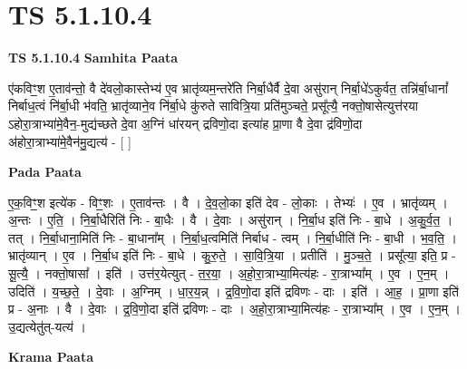 \documentclass[17pt]{extarticle}
\begin{document}
\section{ TS 5.1.10.4 }

\textbf{TS 5.1.10.4 } \newline
\textbf{Samhita Paata} \newline

ए॑कविꣳ॒॒श ए॒ताव॑न्तो॒ वै दे॑वलो॒कास्तेभ्य॑ ए॒व भ्रातृ॑व्यम॒न्तरे॑ति निर्बा॒धैर्वै दे॒वा असु॑रान् निर्बा॒धे॑ऽकुर्वत॒ तन्नि॑र्बा॒धानां᳚ निर्बाध॒त्वं नि॑र्बा॒धी भ॑वति॒ भ्रातृ॑व्याने॒व नि॑र्बा॒धे कु॑रुते सावित्रि॒या प्रति॑मुञ्चते॒ प्रसू᳚त्यै॒ नक्तो॒षासेत्युत्त॑रया ऽहोरा॒त्राभ्या॑मे॒वैन॒-मुद्य॑च्छते दे॒वा अ॒ग्निं धा॑रयन् द्रविणो॒दा इत्या॑ह प्रा॒णा वै दे॒वा द्र॑विणो॒दा अ॑होरा॒त्राभ्या॑मे॒वैन॑मु॒द्यत्य॑ - [  ] \newline

\textbf{Pada Paata} \newline

ए॒क॒विꣳ॒॒श इत्ये॑क - विꣳ॒॒शः । ए॒ताव॑न्तः । वै । दे॒व॒लो॒का इति॑ देव - लो॒काः । तेभ्यः॑ । ए॒व । भ्रातृ॑व्यम् । अ॒न्तः । ए॒ति॒ । नि॒र्बा॒धैरिति॑ निः - बा॒धैः । वै । दे॒वाः । असु॑रान् । नि॒र्बा॒ध इति॑ निः - बा॒धे । अ॒कु॒र्व॒त॒ । तत् । नि॒र्बा॒धाना॒मिति॑ निः - बा॒धाना᳚म् । नि॒र्बा॒ध॒त्वमिति॑ निर्बाध - त्वम् । नि॒र्बा॒धीति॑ निः - बा॒धी । भ॒व॒ति॒ । भ्रातृ॑व्यान् । ए॒व । नि॒र्बा॒ध इति॑ निः - बा॒धे । कु॒रु॒ते॒ । सा॒वि॒त्रि॒या । प्रतीति॑ । मु॒ञ्च॒ते॒ । प्रसू᳚त्या॒ इति॒ प्र - सू॒त्यै॒ । नक्तो॒षासा᳚ । इति॑ । उत्त॑र॒येत्युत् - त॒र॒या॒ । अ॒हो॒रा॒त्राभ्या॒मित्य॑हः - रा॒त्राभ्या᳚म् । ए॒व । ए॒न॒म् । उदिति॑ । य॒च्छ॒ते॒ । दे॒वाः । अ॒ग्निम् । धा॒र॒य॒न्न् । द्र॒वि॒णो॒दा इति॑ द्रविणः - दाः । इति॑ । आ॒ह॒ । प्रा॒णा इति॑ प्र - अ॒नाः । वै । दे॒वाः । द्र॒वि॒णो॒दा इति॑ द्रविणः - दाः । अ॒हो॒रा॒त्राभ्या॒मित्य॑हः - रा॒त्राभ्या᳚म् । ए॒व । ए॒न॒म् । उ॒द्यत्येतु॑त्-यत्य॑ ।  \newline


\textbf{Krama Paata} \newline
\end{document}
